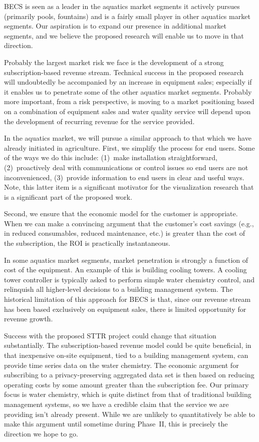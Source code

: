 BECS is seen as a leader in the aquatics market segments it actively pursues
(primarily pools, fountains) and is a fairly small player in other
aquatics market segments.  Our aspiration is to expand our presence
in additional market
segments, and we believe the proposed research will enable us to move
in that direction.

Probably the largest market risk we face is the development of a strong
subscription-based revenue stream.  Technical success in the proposed
research will undoubtedly be accompanied by an increase in equipment sales;
especially if it enables us to penetrate some of the other aquatics
market segments.  Probably more important, from a risk perspective,
is moving to a
market positioning based on a combination of equipment sales and
water quality service will depend upon the development of recurring
revenue for the service provided.

In the aquatics market, we will pursue a similar approach to that which
we have already initiated in agriculture. First, we simplify the process
for end users. Some of the ways we do this include:
(1)~make installation straightforward,
(2)~proactively deal with communications or control issues so end users are not
inconvenienced,
(3)~provide information to end users in clear and useful ways.
Note, this latter item is a significant motivator for the visualization
research that is a significant part of the proposed work.

Second, we ensure that the economic model for the customer is appropriate.
When we can make a convincing argument that the customer's cost savings
(e.g., in reduced consumables, reduced maintenance, etc.) is greater than
the cost of the subscription, the ROI is practically instantaneous.

In some aquatics market segments, market penetration is strongly a function
of cost of the equipment.  An example of this is building cooling towers.
A cooling tower controller is typically asked to perform simple water
chemistry control, and relinquish all higher-level decisions to a
building management system. The historical limitation of this approach
for BECS is that, since our revenue stream has been based exclusively
on equipment sales, there is limited opportunity for revenue growth.

Success with the proposed STTR project could change that situation
substantially.  The subscription-based revenue model could be quite
beneficial, in that inexpensive on-site equipment, tied to a building
management system, can provide time series data on the water chemistry.
The economic argument for subscribing to a privacy-preserving aggregated
data set is then based on reducing operating costs by some amount
greater than the subscription fee.
Our primary focus is water chemistry, which is quite distinct from 
that of traditional
building management systems, so we have a credible claim that the service
we are providing isn't already present.
While we are unlikely to quantitatively
be able to make this argument until sometime during Phase~II, this is
precisely the direction we hope to go.

